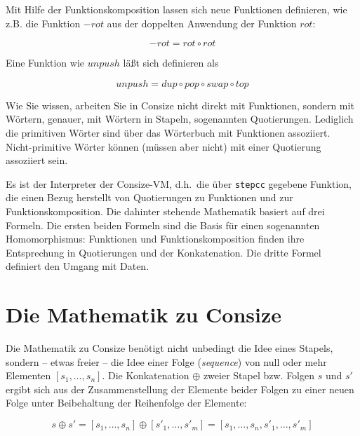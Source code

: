 
Mit Hilfe der Funktionskomposition lassen sich neue Funktionen definieren, wie z.B. die Funktion $-rot$ aus der doppelten Anwendung der Funktion $rot$:

\begin{equation}
-rot = rot \circ rot
\end{equation}



Eine Funktion wie $unpush$ läßt sich definieren als

\begin{equation}
unpush = dup \circ pop \circ swap \circ top
\end{equation}

Wie Sie wissen, arbeiten Sie in Consize nicht direkt mit Funktionen, sondern mit Wörtern, genauer, mit Wörtern in Stapeln, sogenannten Quotierungen. Lediglich die primitiven Wörter sind über das Wörterbuch mit Funktionen assoziiert. Nicht-primitive Wörter können (müssen aber nicht) mit einer Quotierung assoziiert sein.

Es ist der Interpreter der Consize-VM, d.h.\ die über \verb|stepcc| gegebene Funktion, die einen Bezug herstellt von Quotierungen zu Funktionen und zur Funktionskomposition. Die dahinter stehende Mathematik basiert auf drei Formeln. Die ersten beiden Formeln sind die Basis für einen sogenannten Homomorphismus: Funktionen und Funktionskomposition finden ihre Entsprechung in Quotierungen und der Konkatenation. Die dritte Formel definiert den Umgang mit Daten.

\section{Die Mathematik zu Consize}

Die Mathematik zu Consize benötigt nicht unbedingt die Idee eines Stapels, sondern -- etwas freier -- die Idee einer Folge (\emph{sequence}) von null oder mehr Elementen $[s_1,\dots,s_n]$. Die Konkatenation $\oplus$ zweier Stapel bzw. Folgen $s$ und $s'$ ergibt sich aus der Zusammenstellung der Elemente beider Folgen zu einer neuen Folge unter Beibehaltung der Reihenfolge der Elemente:

\begin{equation}
s\oplus s' = [s_1,\dots,s_n]\oplus [s'_1,\dots,s'_m]
           = [s_1,\dots,s_n,s'_1,\dots,s'_m]
\end{equation}


